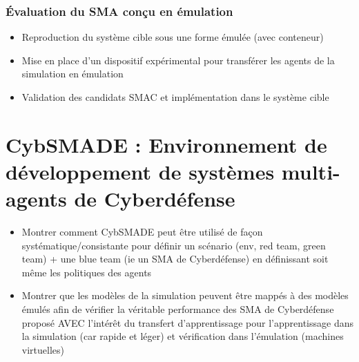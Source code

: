 \subsubsection{Évaluation du SMA conçu en émulation}
\begin{itemize}

    \item Reproduction du système cible sous une forme émulée (avec conteneur)
    \item Mise en place d'un dispositif expérimental pour transférer les agents de la simulation en émulation
    \item Validation des candidats SMAC et implémentation dans le système cible

\end{itemize}

\section{CybSMADE : Environnement de développement de systèmes multi-agents de Cyberdéfense}\label{sec:cybSMAde}

\begin{itemize}

    \item Montrer comment CybSMADE peut être utilisé de façon systématique/consistante pour définir un scénario (env, red team, green team) + une blue team (ie un SMA de Cyberdéfense) en définissant soit même les politiques des agents
    \item Montrer que les modèles de la simulation peuvent être mappés à des modèles émulés afin de vérifier la véritable performance des SMA de Cyberdéfense proposé AVEC l'intérêt du transfert d'apprentissage pour l'apprentissage dans la simulation (car rapide et léger) et vérification dans l'émulation (machines virtuelles)
\end{itemize}